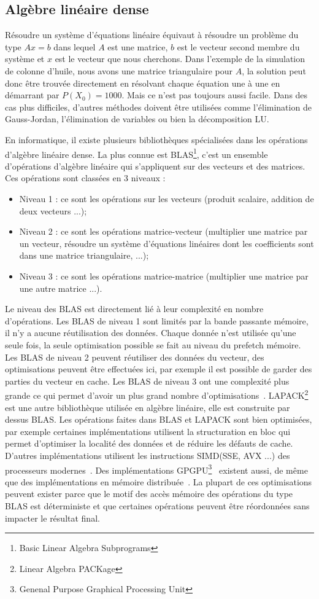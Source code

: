 \subsection{Algèbre linéaire dense}
Résoudre un système d'équations linéaire équivaut à résoudre un problème du type $Ax=b$ dans lequel $A$ est une matrice, $b$ est le vecteur second membre du système et $x$ est le vecteur que nous cherchons.
%
Dans l'exemple de la simulation de colonne d'huile, nous avons une matrice triangulaire pour $A$, la solution peut donc être trouvée directement en résolvant chaque équation une à une en démarrant par $P(X_0) = 1000$.
%
Mais ce n'est pas toujours aussi facile.
%
Dans des cas plus difficiles, d'autres méthodes doivent être utilisées comme l'élimination de Gauss-Jordan, l'élimination de variables ou bien la décomposition LU.

En informatique, il existe plusieurs bibliothèques spécialisées dans les opérations d'algèbre linéaire dense.
%
La plus connue est BLAS\footnote{Basic Linear Algebra Subprograms}, c'est un ensemble d'opérations d'algèbre linéaire qui s'appliquent sur des vecteurs et des matrices.
%
Ces opérations sont classées en 3 niveaux :
\begin{itemize}
  \item Niveau 1 : ce sont les opérations sur les vecteurs (produit scalaire, addition de deux vecteurs ...);
  \item Niveau 2 : ce sont les opérations matrice-vecteur (multiplier une matrice par un vecteur, résoudre un système d'équations linéaires dont les coefficients sont dans une matrice triangulaire, ...);
  \item Niveau 3 : ce sont les opérations matrice-matrice (multiplier une matrice par une autre matrice ...).
\end{itemize}
%
Le niveau des BLAS est directement lié à leur complexité en nombre d'opérations.
%
Les BLAS de niveau 1 sont limités par la bande passante mémoire, il n'y a aucune réutilisation des données.
%
Chaque donnée n'est utilisée qu'une seule fois, la seule optimisation possible se fait au niveau du prefetch mémoire.
%
Les BLAS de niveau 2 peuvent réutiliser des données du vecteur, des optimisations peuvent être effectuées ici, par exemple il est possible de garder des parties du vecteur en cache.
%
Les BLAS de niveau 3 ont une complexité plus grande ce qui permet d'avoir un plus grand nombre d'optimisations~\cite{blas3_opt}.
LAPACK\footnote{Linear Algebra PACKage} est une autre bibliothèque utilisée en algèbre linéaire, elle est construite par dessus BLAS.
%
Les opérations faites dans BLAS et LAPACK sont bien optimisées, par exemple certaines implémentations utilisent la structuration en bloc qui permet d'optimiser la localité des données et de réduire les défauts de cache.
%
D'autres implémentations utilisent les instructions SIMD(SSE, AVX ...) des processeurs modernes~\cite{intel_mkl}.
%
Des implémentations GPGPU\footnote{Genenal Purpose Graphical Processing Unit}~\cite{nvidia_cublas} existent aussi, de même que des implémentations en mémoire distribuée~\cite{dplasma}.
%
La plupart de ces optimisations peuvent exister parce que le motif des accès mémoire des opérations du type BLAS est déterministe et que certaines opérations peuvent être réordonnées sans impacter le résultat final.

